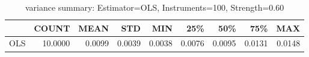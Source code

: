 \begin{table}[ht]
\centering
\caption{variance summary: Estimator=OLS, Instruments=100, Strength=0.60}
\begin{tabular}{lrrrrrrrr}
\toprule
 & COUNT & MEAN & STD & MIN & 25\% & 50\% & 75\% & MAX \\
\midrule
OLS & 10.0000 & 0.0099 & 0.0039 & 0.0038 & 0.0076 & 0.0095 & 0.0131 & 0.0148 \\
\bottomrule
\end{tabular}
\end{table}
